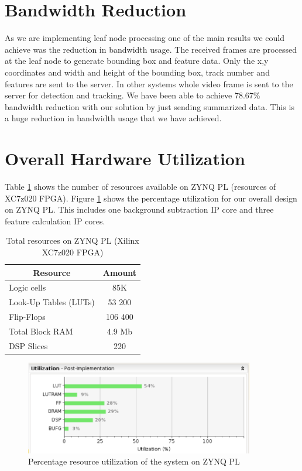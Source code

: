\documentclass[12pt,a4paper]{report}
\begin{document}
\section{Bandwidth Reduction}
 
As we are implementing leaf node processing one of the main results we could achieve was the reduction in bandwidth usage. The received frames are processed at the leaf node to generate bounding box and feature data. Only the x,y coordinates and width and height of the bounding box, track number and features are sent to the server. In other systems whole video frame is sent to the server for detection and tracking.  We have been able to achieve 78.67\% bandwidth reduction with our solution by just sending summarized data. This is a huge reduction in bandwidth usage that we have achieved.

\section{Overall Hardware Utilization}
Table \ref{uti1} shows the number of resources available on ZYNQ PL (resources of XC7z020 FPGA). Figure \ref{util2} shows the percentage utilization for our overall design on ZYNQ PL. This includes one background subtraction IP core and three feature calculation IP cores.
\begin{table}[H]
\centering
\caption{Total resources on ZYNQ PL (Xilinx XC7z020 FPGA)}
\label{uti1}
\begin{tabular}{|l|c|}
\hline
\multicolumn{1}{|c|}{\textbf{Resource}} & \textbf{Amount} \\ \hline
Logic cells                             & 85K             \\ \hline
Look-Up Tables (LUTs)                   & 53 200          \\ \hline
Flip-Flops                              & 106 400         \\ \hline
Total Block RAM                         & 4.9 Mb          \\ \hline
DSP Slices                              & 220             \\ \hline
\end{tabular}
\end{table}


\begin{figure}[H]
\includegraphics[width=10cm]{utilization.png}
\centering
\caption{Percentage resource utilization of the system on ZYNQ PL}
\label{util2}
\end{figure}
\end{document}
